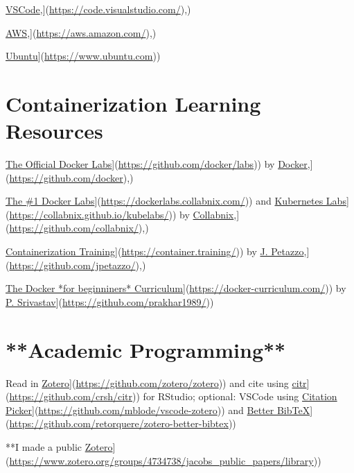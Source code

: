 \documentclass[
]{book}
\begin{document}
\href{\%5Bhttps://code.visualstudio.com/}{VSCode},{]}(\url{https://code.visualstudio.com/}),)

\href{\%5Bhttps://aws.amazon.com/}{AWS},{]}(\url{https://aws.amazon.com/}),)

\href{\%5Bhttps://www.ubuntu.com}{Ubuntu}{]}(\url{https://www.ubuntu.com}))

\section{Containerization Learning Resources}\label{containerization-learning-resources}

\href{\%5Bhttps://github.com/docker/labs}{The Official Docker Labs}{]}(\url{https://github.com/docker/labs})) by \href{\%5Bhttps://github.com/docker}{Docker},{]}(\url{https://github.com/docker}),)

\href{\%5Bhttps://dockerlabs.collabnix.com/}{The \#1 Docker Labs}{]}(\url{https://dockerlabs.collabnix.com/})) and \href{\%5Bhttps://collabnix.github.io/kubelabs/}{Kubernetes Labs}{]}(\url{https://collabnix.github.io/kubelabs/})) by \href{\%5Bhttps://github.com/collabnix/}{Collabnix},{]}(\url{https://github.com/collabnix/}),)

\href{\%5Bhttps://container.training/}{Containerization Training}{]}(\url{https://container.training/})) by \href{\%5Bhttps://github.com/jpetazzo/}{J. Petazzo},{]}(\url{https://github.com/jpetazzo/}),)

\href{\%5Bhttps://docker-curriculum.com/}{The Docker *for beginniners* Curriculum}{]}(\url{https://docker-curriculum.com/})) by \href{\%5Bhttps://github.com/prakhar1989/}{P. Srivastav}{]}(\url{https://github.com/prakhar1989/}))

\section{**Academic Programming**}\label{academic-programming}

Read in \href{\%5Bhttps://github.com/zotero/zotero}{Zotero}{]}(\url{https://github.com/zotero/zotero})) and cite using \href{\%5Bhttps://github.com/crsh/citr}{citr}{]}(\url{https://github.com/crsh/citr})) for RStudio; optional: VSCode using \href{\%5Bhttps://github.com/mblode/vscode-zotero}{Citation Picker}{]}(\url{https://github.com/mblode/vscode-zotero})) and \href{\%5Bhttps://github.com/retorquere/zotero-better-bibtex}{Better BibTeX}{]}(\url{https://github.com/retorquere/zotero-better-bibtex}))

**I made a public \href{\%5Bhttps://www.zotero.org/groups/4734738/jacobs_public_papers/library}{Zotero}{]}(\url{https://www.zotero.org/groups/4734738/jacobs_public_papers/library}))
\end{document}
